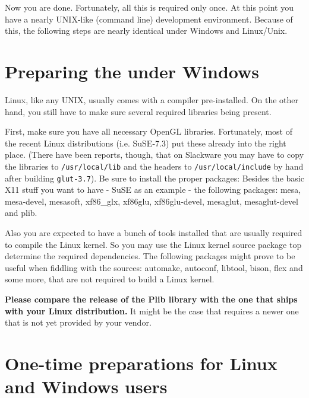 Now you are done. Fortunately, all this is required only once. At this point you have
a nearly UNIX-like (command line) development environment. Because of this, the following
steps are nearly identical under Windows and Linux/Unix.

\section{Preparing the  under Windows\label{preparelin}}
Linux, like any UNIX, usually comes with a compiler pre-installed. On the other hand, you still have to make sure several required libraries being present.

First, make sure you have all necessary OpenGL libraries. Fortunately, most of the recent Linux distributions (i.e. SuSE-7.3) put these already into the right place. (There have been reports, though, that on  Slackware you may have to copy the libraries to \texttt{/usr/local/lib} and the headers to \texttt{/usr/local/include} by hand after building \texttt{glut-3.7}). Be sure to install the proper packages: Besides the basic X11 stuff you want to have - SuSE as an
example - the following packages: mesa, mesa-devel, mesasoft, xf86\_glx,
xf86glu, xf86glu-devel, mesaglut, mesaglut-devel and plib. 

Also you are expected to have a bunch of tools installed that are usually
required to compile the Linux kernel. So you may use the Linux kernel source
package top determine the required dependencies. The following packages
might prove to be useful when fiddling with the \FlightGear{} sources:
automake, autoconf, libtool, bison, flex and some more, that are not
required to build a Linux kernel.

{\bfseries Please compare the release of the Plib library with the one that ships with
your Linux distribution.} It might be the case that \FlightGear{} requires a
newer one that is not yet provided by your vendor.

\section{One-time preparations for Linux and Windows users\label{preparelinwin}}

